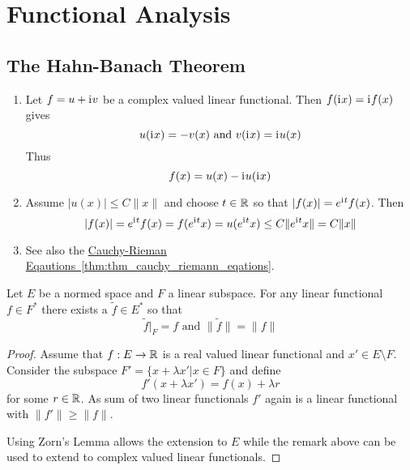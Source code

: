 \newpage
\section{Functional Analysis}

\subsection{The Hahn-Banach Theorem}

\begin{remarks}
    \hfill
    \begin{enumerate}
        \item Let \( f = u + \mathrm{i}\mkern1mu v\) be a complex valued linear functional.
              Then \( f(\mathrm{i}\mkern1mu x) = \mathrm{i}\mkern1mu f(x) \) gives
              \[
                  u(\mathrm{i}\mkern1mu x) = -v(x) \text{ and } v(\mathrm{i}\mkern1mu x) = \mathrm{i}\mkern1mu u(x)
              \]
              Thus
              \[
                  f(x) = u(x) - \mathrm{i}\mkern1mu u(\mathrm{i}\mkern1mu x)
              \]
        \item Assume \( |u(x)| \le C\|x\| \) and choose \( t \in \mathbb{R} \) so that \( |f(x)| = e^{\mathrm{i}\mkern1mu t}f(x) \).
              Then
              \[
                  |f(x)| = e^{\mathrm{i}\mkern1mu t}f(x) = f(e^{\mathrm{i}\mkern1mu t}x) = u(e^{\mathrm{i}\mkern1mu t}x) \le C\|e^{\mathrm{i}\mkern1mu t}x\| = C\|x\|
              \]
        \item
              See also the \hyperref[thm:thm_cauchy_riemann_eqations]{Cauchy-Rieman Eqautions~\ref*{thm:thm_cauchy_riemann_eqations}}.
    \end{enumerate}
\end{remarks}
\bigskip


\begin{theorem}\label{thm:hahn_banach}
    Let \( E \) be a normed space and \( F \) a linear subspace. For any linear functional
    \( f \in F^* \) there exists a \( \tilde{f} \in E^* \) so that
    \[
        \tilde{f}|_F = f \text{ and } \|\tilde{f}\| = \|f\|
    \]
\end{theorem}

\begin{proof}
    Assume that \( f: E \to \mathbb{R} \) is a real valued linear functional and \( x' \in E \setminus F \).
    Consider the subspace \( F' = \{x + \lambda x' | x \in F \} \) and define
    \[
        f'(x + \lambda x') = f(x) + \lambda r
    \]
    for some \( r \in \mathbb{R} \).  As sum of two linear functionals \( f' \) again is a linear functional with
    \( \|f'\| \ge \|f\| \).

    Using Zorn's Lemma allows the extension to \( E \) while the remark above can be used to extend
    to complex valued linear functionals.
\end{proof}
\bigskip


